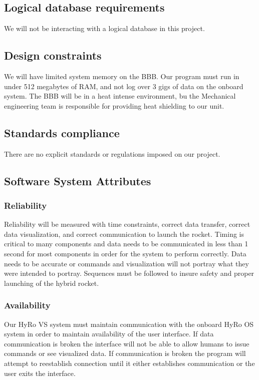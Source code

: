 \documentclass[10pt,draftclsnofoot,onecolumn,compsoc]{IEEEtran}
\begin{document}
\subsection{Logical database requirements}
We will not be interacting with a logical database in this project.

\subsection{Design constraints}
We will have limited system memory on the BBB. Our program must run in under 512 megabytes of RAM, and not log over 3 gigs of data on the onboard system. The BBB will be in a heat intense environment, bu the Mechanical engineering team is responsible for providing heat shielding to our unit.

\subsection{Standards compliance}
There are no explicit standards or regulations imposed on our project.

\subsection{Software System Attributes}
\subsubsection{Reliability} Reliability will be measured with time constraints, correct data transfer, correct data visualization, and correct communication to launch the rocket. Timing is critical to many components and data needs to be communicated in less than 1 second for most components in order for the system to perform correctly. Data needs to be accurate or commands and visualization will not portray what they were intended to portray. Sequences must be followed to insure safety and proper launching of the hybrid rocket.
\subsubsection{Availability}
Our HyRo VS system must maintain communication with the onboard HyRo OS system in order to maintain availability of the user interface. If data communication is broken the interface will not be able to allow humans to issue commands or see visualized data. If communication is broken the program will attempt to reestablish connection until it either establishes communication or the user exits the interface.
\end{document}

